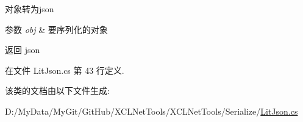 对象转为json 


\begin{DoxyParams}{参数}
{\em obj} & 要序列化的对象\\
\hline
\end{DoxyParams}
\begin{DoxyReturn}{返回}
json
\end{DoxyReturn}


在文件 Lit\-Json.\-cs 第 43 行定义.



该类的文档由以下文件生成\-:\begin{DoxyCompactItemize}
\item 
D\-:/\-My\-Data/\-My\-Git/\-Git\-Hub/\-X\-C\-L\-Net\-Tools/\-X\-C\-L\-Net\-Tools/\-Serialize/\hyperlink{_lit_json_8cs}{Lit\-Json.\-cs}\end{DoxyCompactItemize}
